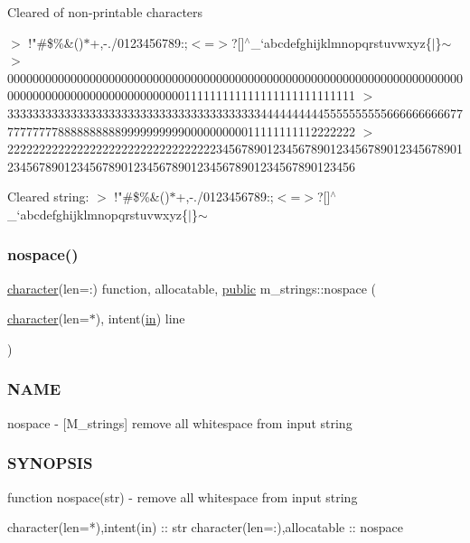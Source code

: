 Cleared of non-\/printable characters

$>$ !"\#\$\%\&\textquotesingle{}()$\ast$+,-\/./0123456789\+:;$<$=$>$?\mbox{[}\mbox{]}$^\wedge$\+\_\+`abcdefghijklmnopqrstuvwxyz\{$\vert$\}$\sim$ $>$0000000000000000000000000000000000000000000000000000000000000000000000000000000000000000000000000000111111111111111111111111111 $>$3333333333333333333333333333333333333333444444444455555555556666666666777777777788888888889999999999000000000011111111112222222 $>$2222222222222222222222222222222223456789012345678901234567890123456789012345678901234567890123456789012345678901234567890123456

Cleared string\+: $>$ !"\#\$\%\&\textquotesingle{}()$\ast$+,-\/./0123456789\+:;$<$=$>$?\mbox{[}\mbox{]}$^\wedge$\+\_\+`abcdefghijklmnopqrstuvwxyz\{$\vert$\}$\sim$ \mbox{\label{namespacem__strings_ad007f050abe3d142f4a7badbc4408685}} 
\subsubsection{\texorpdfstring{nospace()}{nospace()}}
{\footnotesize\ttfamily \hyperlink{option__stopwatch_83_8txt_abd4b21fbbd175834027b5224bfe97e66}{character}(len=\+:) function, allocatable, \hyperlink{M__stopwatch_83_8txt_a2f74811300c361e53b430611a7d1769f}{public} m\+\_\+strings\+::nospace (\begin{DoxyParamCaption}\item[{\hyperlink{option__stopwatch_83_8txt_abd4b21fbbd175834027b5224bfe97e66}{character}(len=$\ast$), intent(\hyperlink{M__journal_83_8txt_afce72651d1eed785a2132bee863b2f38}{in})}]{line }\end{DoxyParamCaption})}



\subsubsection*{N\+A\+ME}

nospace -\/ \mbox{[}M\+\_\+strings\mbox{]} remove all whitespace from input string 

\subsubsection*{S\+Y\+N\+O\+P\+S\+IS}

\begin{DoxyVerb}function nospace(str) - remove all whitespace from input string

 character(len=*),intent(in)          :: str
 character(len=:),allocatable         :: nospace
\end{DoxyVerb}


